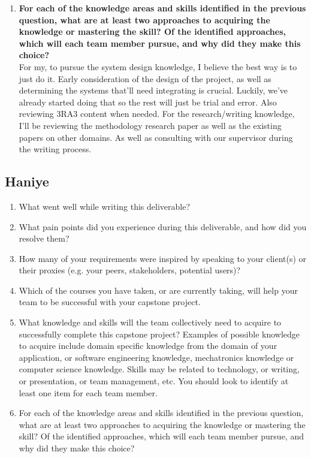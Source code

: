 \begin{enumerate}
{  least one item for each team member.} \\
  I think the team needs to acquire system design knowledge. Although we've all had experience working adding/updating features of pre-existing projects, starting a completely new one and having to think of all the design requirements will be hard. Additionally, due to the research section, we'll also need to get research, and by expansion, writing knowledge.
  \item \textbf{For each of the knowledge areas and skills identified in the previous
  question, what are at least two approaches to acquiring the knowledge or
  mastering the skill?  Of the identified approaches, which will each team
  member pursue, and why did they make this choice?} \\
  For my, to pursue the system design knowledge, I believe the best way is to just do it. Early consideration of the design of the project, as well as determining the systems that'll need integrating is crucial. Luckily, we've already started doing that so the rest will just be trial and error. Also reviewing 3RA3 content when needed.
  For the research/writing knowledge, I'll be reviewing the methodology research paper as well as the existing papers on other domains. As well as consulting with our supervisor during the writing process.
\end{enumerate}
\subsection*{Haniye}
\begin{enumerate}
  \item What went well while writing this deliverable? 
  \item What pain points did you experience during this deliverable, and how did
  you resolve them?
  \item How many of your requirements were inspired by speaking to your
  client(s) or their proxies (e.g. your peers, stakeholders, potential users)?
  \item Which of the courses you have taken, or are currently taking, will help
  your team to be successful with your capstone project.
  \item What knowledge and skills will the team collectively need to acquire to
  successfully complete this capstone project?  Examples of possible knowledge
  to acquire include domain specific knowledge from the domain of your
  application, or software engineering knowledge, mechatronics knowledge or
  computer science knowledge.  Skills may be related to technology, or writing,
  or presentation, or team management, etc.  You should look to identify at
  least one item for each team member.
  \item For each of the knowledge areas and skills identified in the previous
  question, what are at least two approaches to acquiring the knowledge or
  mastering the skill?  Of the identified approaches, which will each team
  member pursue, and why did they make this choice?
\end{enumerate}
